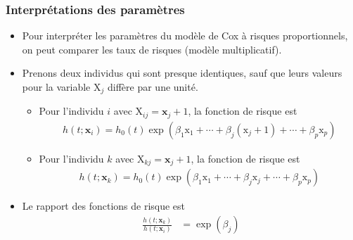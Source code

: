 \documentclass{beamer}
\begin{document}
\begin{frame}
\frametitle{Interprétations des paramètres}
\begin{itemize}
\item Pour interpréter les paramètres du modèle de Cox à risques proportionnels, on peut comparer les taux de risques (modèle multiplicatif). 
\item Prenons deux individus qui sont presque identiques, sauf que leurs valeurs pour la variable $\mathrm{X}_j$ diffère par une unité. 
\begin{itemize}
\vp \vp
\item Pour l'individu $i$ avec $\mathrm{X}_{ij}=\mathbf{x}_j+1$, la fonction de risque est
\begin{align*}
h(t; \mathbf{x}_i) = h_0(t) \exp(\beta_1 \mathrm{x}_1 + \cdots + \beta_j (\mathrm{x}_j+1)+\cdots + \beta_p \mathrm{x}_p)
\end{align*}
\item Pour l'individu $k$ avec $\mathrm{X}_{kj}=\mathbf{x}_j+1$, la fonction de risque est
\begin{align*}
h(t; \mathbf{x}_k) = h_0(t) \exp(\beta_1 \mathrm{x}_1 + \cdots + \beta_j \mathrm{x}_j+\cdots + \beta_p \mathrm{x}_p)
\end{align*}
\end{itemize}
\item Le \alert{rapport} des fonctions de risque  est
\begin{align*}
\frac{h(t; \mathbf{x}_k)}{h(t; \mathbf{x}_i)} &= 
 \exp(\beta_j)
\end{align*}
\end{itemize}
\end{frame}
\end{document}
